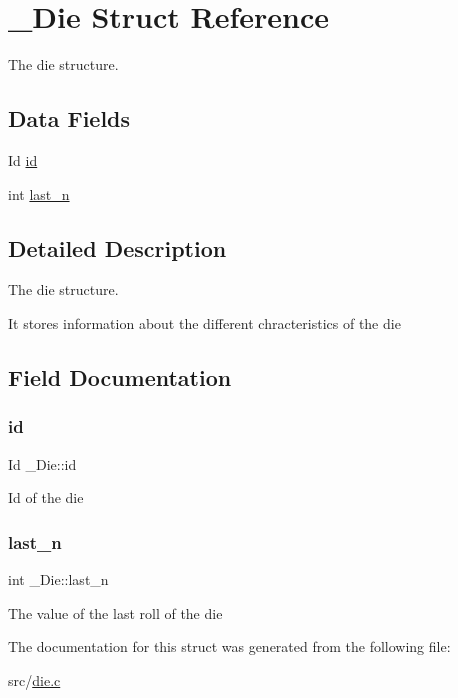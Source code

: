 \hypertarget{struct__Die}{}\section{\+\_\+\+Die Struct Reference}
\label{struct__Die}


The die structure.  


\subsection*{Data Fields}
\begin{DoxyCompactItemize}
\item 
Id \hyperlink{struct__Die_a0887af562dda760409957f13619d36f1}{id}
\item 
int \hyperlink{struct__Die_abf73744a544920c64d79d84d964be62d}{last\+\_\+n}
\end{DoxyCompactItemize}


\subsection{Detailed Description}
The die structure. 

It stores information about the different chracteristics of the die 

\subsection{Field Documentation}
\mbox{\label{struct__Die_a0887af562dda760409957f13619d36f1}} 
\subsubsection{\texorpdfstring{id}{id}}
{\footnotesize\ttfamily Id \+\_\+\+Die\+::id}

Id of the die \mbox{\label{struct__Die_abf73744a544920c64d79d84d964be62d}} 
\subsubsection{\texorpdfstring{last\+\_\+n}{last\_n}}
{\footnotesize\ttfamily int \+\_\+\+Die\+::last\+\_\+n}

The value of the last roll of the die 

The documentation for this struct was generated from the following file\+:\begin{DoxyCompactItemize}
\item 
src/\hyperlink{die_8c}{die.\+c}\end{DoxyCompactItemize}

